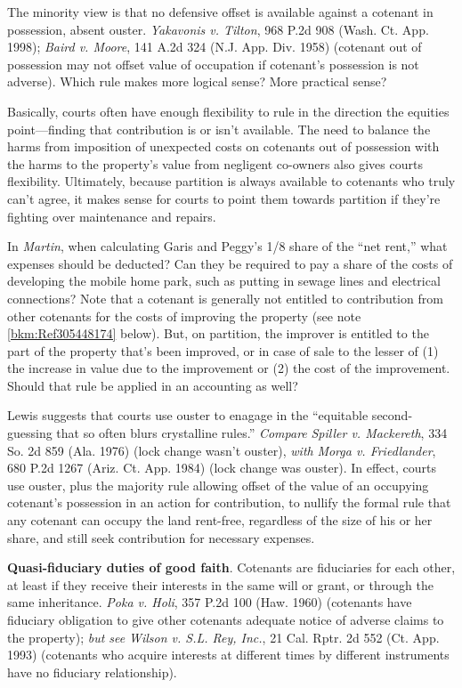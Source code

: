 The minority view is that no defensive offset is available against a cotenant in
possession, absent ouster. \emph{Yakavonis v. Tilton}, 968 P.2d 908 (Wash. Ct.
App. 1998); \emph{Baird v. Moore}, 141 A.2d 324 (N.J. App. Div. 1958) (cotenant
out of possession may not offset value of occupation if cotenant's possession is
not adverse). Which rule makes more logical sense? More practical sense?


Basically, courts often have enough flexibility to rule in the direction the
equities point---finding that contribution is or isn't available. The need to
balance the harms from imposition of unexpected costs on cotenants out of
possession with the harms to the property's value from negligent co-owners also
gives courts flexibility. Ultimately, because partition is always available to
cotenants who truly can't agree, it makes sense for courts to point them
towards partition if they're fighting over maintenance and repairs.


In \textit{Martin}, when calculating Garis and Peggy's 1/8
share of the ``net rent,'' what expenses should be deducted? Can they be
required to pay a share of the costs of developing the mobile home park, such
as putting in sewage lines and electrical connections? Note that a cotenant is
generally not entitled to contribution from other cotenants for the costs of
improving the property (see note \ref{bkm:Ref305448174} below). But, on
partition, the improver is entitled to the part of the property that's been
improved, or in case of sale to the lesser of (1) the increase in value due to
the improvement or (2) the cost of the improvement. Should that rule be
applied in an accounting as well?

Lewis suggests that courts use ouster to enagage in the ``equitable
second-guessing that so often blurs crystalline rules.'' \emph{Compare}
\emph{Spiller v. Mackereth}, 334 So. 2d 859 (Ala. 1976) (lock change wasn't
ouster), \emph{with} \emph{Morga v. Friedlander}, 680 P.2d 1267 (Ariz. Ct. App.
1984) (lock change was ouster). In effect, courts use ouster, plus the majority
rule allowing offset of the value of an occupying cotenant's possession in an
action for contribution, to nullify the formal rule that any cotenant can occupy
the land rent-free, regardless of the size of his or her share, and still seek
contribution for necessary expenses.


\item \textbf{Quasi-fiduciary duties of good faith}. Cotenants are fiduciaries
for each other, at least if they receive their interests in the same will or
grant, or through the same inheritance. \emph{Poka v. Holi}, 357 P.2d 100 (Haw.
1960) (cotenants have fiduciary obligation to give other cotenants adequate
notice of adverse claims to the property); \emph{but see} \emph{Wilson v. S.L.
Rey, Inc.}, 21 Cal. Rptr. 2d 552 (Ct. App. 1993) (cotenants who acquire
interests at different times by different instruments have no fiduciary
relationship).


